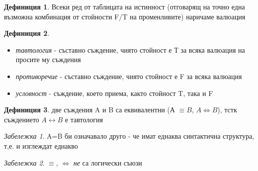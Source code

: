 \documentclass[10pt, a4paper]{article}
\theoremstyle{definition}
\newtheorem{definition}{Дефиниция}[section]
\theoremstyle{remark}
\newtheorem*{remark}{Забележка}
\begin{document}
\begin{definition}
    Всеки ред от таблицата на истинност (отговарящ на точно една възможна комбинация от стойности F/T на променливите) наричаме валюация
\end{definition}

\begin{definition}
\hfill
    \begin{itemize}
        \item \emph{тавтология} - съставно съждение, чиято стойност е Т за всяка валюация на просите му съждения
        \item \emph{противоречие} - съставно съждение, чиято стойност е F за всяка валюация
        \item \emph{условност} - съждение, което приема, както стойност T, така и F
    \end{itemize}
\end{definition}

\begin{definition}
    две съждения A и B са еквивалентни (А \( \equiv B\), \(A\Leftrightarrow B\)), тстк съждението \(A\leftrightarrow B\) е тавтология
\end{definition}
\begin{remark}
    A=B би означавало друго - че имат еднаква синтактична структура, т,е. и изглеждат еднакво
\end{remark}
\begin{remark}
    \(\equiv\), \(\Leftrightarrow\) \emph{не} са логически съюзи
\end{remark}
\hfill
\end{document}

